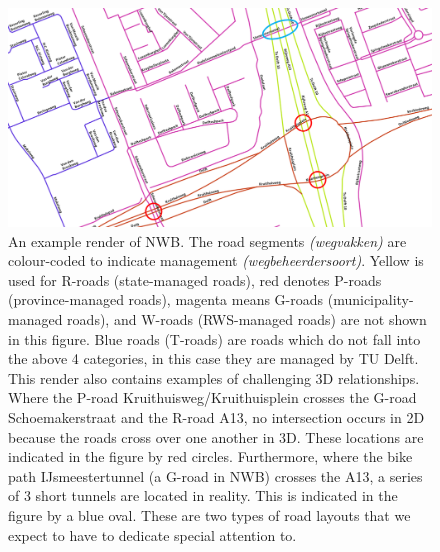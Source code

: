\begin{figure}[h]
    \centering
    \includegraphics[width=\linewidth]{p2/figs/nwb_sample_02.png} 
    \caption{An example render of NWB. The road segments \textit{(wegvakken)} are colour-coded to indicate management \textit{(wegbeheerdersoort)}. Yellow is used for R-roads (state-managed roads), red denotes P-roads (province-managed roads), magenta means G-roads (municipality-managed roads), and W-roads (RWS-managed roads) are not shown in this figure. Blue roads (T-roads) are roads which do not fall into the above 4 categories, in this case they are managed by TU Delft. This render also contains examples of challenging 3D relationships. Where the P-road Kruithuisweg/Kruithuisplein crosses the G-road Schoemakerstraat and the R-road A13, no intersection occurs in 2D because the roads cross over one another in 3D. These locations are indicated in the figure by red circles. Furthermore, where the bike path IJsmeestertunnel (a G-road in NWB) crosses the A13, a series of 3 short tunnels are located in reality. This is indicated in the figure by a blue oval. These are two types of road layouts that we expect to have to dedicate special attention to.}
    \label{fig:nwb}
\end{figure}

